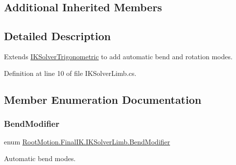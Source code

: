 \subsection*{Additional Inherited Members}


\subsection{Detailed Description}
Extends \mbox{\hyperlink{class_root_motion_1_1_final_i_k_1_1_i_k_solver_trigonometric}{I\+K\+Solver\+Trigonometric}} to add automatic bend and rotation modes. 



Definition at line 10 of file I\+K\+Solver\+Limb.\+cs.



\subsection{Member Enumeration Documentation}
\mbox{\label{class_root_motion_1_1_final_i_k_1_1_i_k_solver_limb_ae89bba0551841f9418b918ef8bff893c}} 
\subsubsection{\texorpdfstring{Bend\+Modifier}{BendModifier}}
{\footnotesize\ttfamily enum \mbox{\hyperlink{class_root_motion_1_1_final_i_k_1_1_i_k_solver_limb_ae89bba0551841f9418b918ef8bff893c}{Root\+Motion.\+Final\+I\+K.\+I\+K\+Solver\+Limb.\+Bend\+Modifier}}\hspace{0.3cm}{\ttfamily [strong]}}



Automatic bend modes. 

